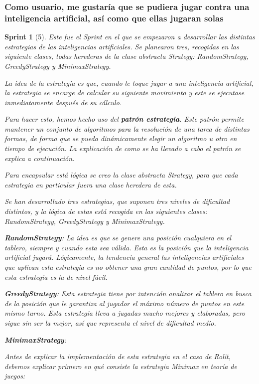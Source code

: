 \documentclass{article}
\theoremstyle{break}
\newtheorem*{sprint}{Sprint}
\begin{document}
\subsubsection{Como usuario, me gustaría que se pudiera jugar contra una inteligencia artificial, así como que ellas jugaran solas}
\begin{sprint}[5]
Este fue el Sprint en el que se empezaron a desarrollar las distintas estrategias de las inteligencias artificiales. Se planearon tres, recogidas en las siguiente clases, todas herederas de la clase abstracta Strategy: RandomStrategy, GreedyStrategy y MinimaxStrategy.

La idea de la estrategia es que, cuando le toque jugar a una inteligencia artificial, la estrategia se encarge de calcular su siguiente movimiento y este se ejecutase inmediatamente después de su cálculo.

Para hacer esto, hemos hecho uso del \textbf{patrón estrategia}. Este patrón permite mantener un conjunto de algoritmos para la resolución de una tarea de distintas formas, de forma que se pueda dinámicamente elegir un algoritmo u otro en tiempo de ejecución. La explicación de como se ha llevado a cabo el patrón se explica a continuación.

Para encapsular está lógica se creo la clase abstracta Strategy, para que cada estrategia en particular fuera una clase heredera de esta.

Se han desarrollado tres estrategias, que suponen tres niveles de dificultad distintos, y la lógica de estas está recogida en las siguientes clases: RandomStrategy, GreedyStrategy y MinimaxStrategy.

\textbf{RandomStrategy}:
La idea es que se genere una posición cualquiera en el tablero, siempre y cuando esta sea válida. Esta es la posición que la inteligencia artificial jugará.
Lógicamente, la tendencia general las inteligencias artificiales que aplican esta estrategia es no obtener una gran cantidad de puntos, por lo que esta estrategia es la de nivel fácil.

\textbf{GreedyStrategy}:
Esta estrategia tiene por intención analizar el tablero en busca de la posición que le garantiza al jugador el máximo número de puntos en este mismo turno. Esta estrategia lleva a jugadas mucho mejores y elaboradas, pero sigue sin ser la mejor, así que representa el nivel de dificultad medio.

\textbf{MinimaxStrategy}:

Antes de explicar la implementación de esta estrategia en el caso de Rolit, debemos explicar primero en qué consiste la estrategia Minimax en teoría de juegos:


\end{sprint}
\end{document}
